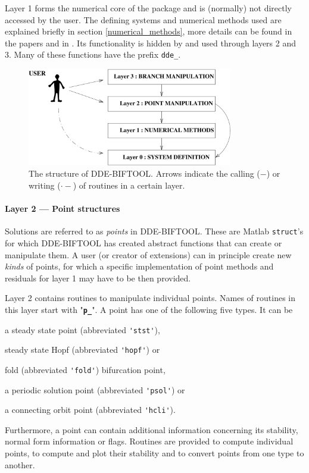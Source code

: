 \documentclass[10pt]{scrartcl}
\newcommand{\DDEBIFCODE}{\textsc{DDE-BIFTOOL}}
\newcommand{\file}[1]{\textbf{\texttt{#1}}}
\newcommand{\blist}[1]{\mbox{\lstinline!#1!}}
\begin{document}
Layer 1 forms the numerical core of the package and is (normally) not
directly accessed by the user. The defining systems and numerical
methods used are explained briefly in section \ref{numerical_methods},
more details can be found in the papers
\cite{Luzy96,Enge99a,Enge99b,en_d01,engel01,luz01,homoclinic} and in
\cite{Enge00}. Its functionality is hidden by and used through layers
2 and 3. Many of these functions have the prefix \blist{dde_}.
\begin{figure}[t]
\begin{center}
\includegraphics[width=0.8\textwidth]{fig/code_struct}
\end{center}
\caption{\label{struct_pic}
The structure of {\DDEBIFCODE}. Arrows indicate the 
calling ($-$) or writing ($\cdot-$) of routines in a certain layer.} 
\end{figure}

\paragraph{Layer 2 --- Point structures}
Solutions are referred to as \emph{points} in \DDEBIFCODE{}. These are
Matlab \texttt{struct}'s for which \DDEBIFCODE{} has created abstract
functions that can create or manipulate them. A user (or creator of
extensions) can in principle create new \emph{kinds} of points, for
which a specific implementation of point methods and residuals for
layer 1 may have to be then provided.

Layer 2 contains routines to manipulate individual points.  Names of
routines in this layer start with "\file{p\_}".  A point has one of
the following five types. It can be
\begin{compactenum}
\item  a steady state point (abbreviated
\blist{'stst'}), 
\item steady state Hopf (abbreviated \blist{'hopf'}) or
\item fold (abbreviated \blist{'fold'}) bifurcation point, 
\item a periodic
  solution point (abbreviated \blist{'psol'}) or 
\item a connecting orbit
  point (abbreviated \blist{'hcli'}).
\end{compactenum}
Furthermore, a point can contain
additional information concerning its stability, normal form
information or flags.  Routines are provided to compute individual
points, to compute and plot their stability and to convert points from
one type to another.
\end{document}
